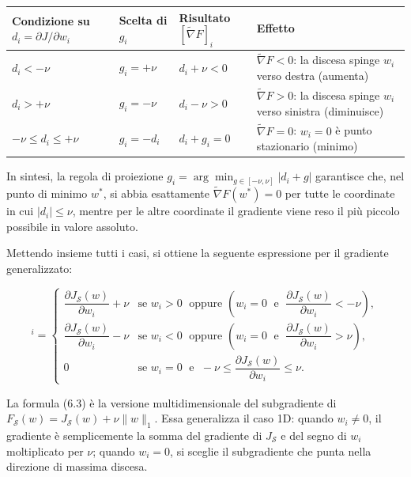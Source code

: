 \documentclass[a4paper,12pt]{article}
\begin{document}
{\small
\setlength{\tabcolsep}{4pt}
\renewcommand{\arraystretch}{1.3}
\begin{center}
\begin{tabular}{>{\raggedright\arraybackslash}p{}
                >{\raggedright\arraybackslash}p{}
                >{\raggedright\arraybackslash}p{}
                >{\raggedright\arraybackslash}p{}}
\toprule
Condizione su $d_i = \partial J/\partial w_i$ &
Scelta di $g_i$ &
Risultato $[\widetilde{\nabla}F]_i$ &
Effetto \\
\midrule
$d_i < -\nu$ &
$g_i = +\nu$ &
$d_i + \nu < 0$ &
$\widetilde{\nabla}F < 0$: la discesa spinge $w_i$ verso destra (aumenta) \\
$d_i > +\nu$ &
$g_i = -\nu$ &
$d_i - \nu > 0$ &
$\widetilde{\nabla}F > 0$: la discesa spinge $w_i$ verso sinistra (diminuisce) \\
$-\nu \leq d_i \leq +\nu$ &
$g_i = -d_i$ &
$d_i + g_i = 0$ &
$\widetilde{\nabla}F = 0$: $w_i = 0$ è punto stazionario (minimo) \\
\bottomrule
\end{tabular}
\end{center}
}

In sintesi, la regola di proiezione \(g_i = \arg\min_{g \in [-\nu,\nu]} |d_i + g|\) garantisce che, nel punto di minimo \(w^*\), si abbia esattamente \(\widetilde{\nabla}F(w^*) = 0\) per tutte le coordinate in cui \(|d_i| \le \nu\), mentre per le altre coordinate il gradiente viene reso il più piccolo possibile in valore assoluto.

Mettendo insieme tutti i casi, si ottiene la seguente espressione per il
gradiente generalizzato:

\vspace*{-\baselineskip}
\begin{equation}
[\widetilde{\nabla} F_{\mathcal{S}}(w)]^i =
\begin{cases}
\dfrac{\partial J_{\mathcal{S}}(w)}{\partial w_i} + \nu
& \text{se } w_i > 0 \;\text{ oppure } \left( w_i = 0 \;\text{ e }\; \dfrac{\partial J_{\mathcal{S}}(w)}{\partial w_i} < -\nu \right), \\[12pt]
\dfrac{\partial J_{\mathcal{S}}(w)}{\partial w_i} - \nu
& \text{se } w_i < 0 \;\text{ oppure } \left( w_i = 0 \;\text{ e }\; \dfrac{\partial J_{\mathcal{S}}(w)}{\partial w_i} > \nu \right), \\[12pt]
0
& \text{se } w_i = 0 \;\text{ e }\; -\nu \leq \dfrac{\partial J_{\mathcal{S}}(w)}{\partial w_i} \leq \nu.
\end{cases}
\tag{6.3}
\end{equation}
\vspace*{-\baselineskip}
\begin{notebox}
  La formula (6.3) è la versione multidimensionale del subgradiente di
  $F_{\mathcal{S}}(w) = J_{\mathcal{S}}(w) + \nu\|w\|_1$. Essa generalizza
  il caso 1D: quando $w_i \neq 0$, il gradiente è semplicemente la somma
  del gradiente di $J_{\mathcal{S}}$ e del segno di $w_i$ moltiplicato per $\nu$;
  quando $w_i = 0$, si sceglie il subgradiente che punta nella direzione di
  massima discesa.
\end{notebox}
\end{document}
